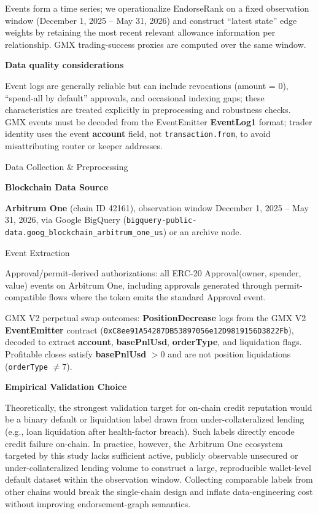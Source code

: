 Events form a time series; we operationalize EndorseRank on a fixed observation window (December 1, 2025 -- May 31, 2026) and construct ``latest state'' edge weights by retaining the most recent relevant allowance information per relationship. GMX trading-success proxies are computed over the same window.


\textbf{Data quality considerations}


Event logs are generally reliable but can include revocations (amount = 0), ``spend-all by default'' approvals, and occasional indexing gaps; these characteristics are treated explicitly in preprocessing and robustness checks. GMX events must be decoded from the EventEmitter \textbf{EventLog1} format; trader identity uses the event \textbf{account} field, not \texttt{transaction.from}, to avoid misattributing router or keeper addresses.


Data Collection \& Preprocessing


\textbf{Blockchain Data Source}


\textbf{Arbitrum One} (chain ID 42161), observation window December 1, 2025 -- May 31, 2026, via Google BigQuery (\texttt{bigquery-public-data.goog\_blockchain\_arbitrum\_one\_us}) or an archive node.


Event Extraction


Approval/permit-derived authorizations: all ERC-20 Approval(owner, spender, value) events on Arbitrum One, including approvals generated through permit-compatible flows where the token emits the standard Approval event.


GMX V2 perpetual swap outcomes: \textbf{PositionDecrease} logs from the GMX V2 \textbf{EventEmitter} contract (\texttt{0xC8ee91A54287DB53897056e12D9819156D3822Fb}), decoded to extract \textbf{account}, \textbf{basePnlUsd}, \textbf{orderType}, and liquidation flags. Profitable closes satisfy \textbf{basePnlUsd} $> 0$ and are not position liquidations (\texttt{orderType} $\neq 7$).


\textbf{Empirical Validation Choice}


Theoretically, the strongest validation target for on-chain credit reputation would be a binary default or liquidation label drawn from under-collateralized lending (e.g., loan liquidation after health-factor breach). Such labels directly encode credit failure on-chain. In practice, however, the Arbitrum One ecosystem targeted by this study lacks sufficient active, publicly observable unsecured or under-collateralized lending volume to construct a large, reproducible wallet-level default dataset within the observation window. Collecting comparable labels from other chains would break the single-chain design and inflate data-engineering cost without improving endorsement-graph semantics.


